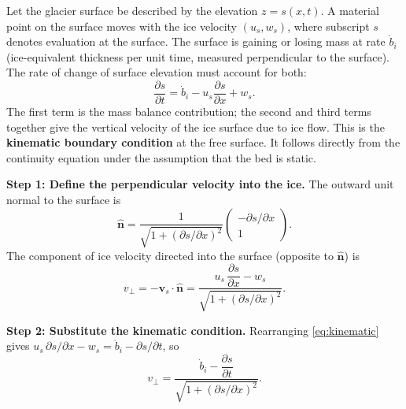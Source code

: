 \documentclass[11pt]{article}
\begin{document}
\begin{tcolorbox}[
  colback=orange!25,
  colframe=orange!70!black,
  title={\textbf{Derivation: Submergence and Emergence Velocities from the Kinematic Boundary Condition}},
  fonttitle=\bfseries,
  breakable
]

Let the glacier surface be described by the elevation $z = s(x,t)$.  A material point on the surface moves with the ice velocity $(u_s, w_s)$, where subscript $s$ denotes evaluation at the surface.  The surface is gaining or losing mass at rate $\dot{b}_i$ (ice-equivalent thickness per unit time, measured perpendicular to the surface).  The rate of change of surface elevation must account for both:
\begin{equation}
  \frac{\partial s}{\partial t} = \dot{b}_i - u_s\frac{\partial s}{\partial x} + w_s.
  \label{eq:kinematic}
\end{equation}
The first term is the mass balance contribution; the second and third terms together give the vertical velocity of the ice surface due to ice flow.  This is the \textbf{kinematic boundary condition} at the free surface.  It follows directly from the continuity equation under the assumption that the bed is static.

\medskip
\noindent\textbf{Step 1: Define the perpendicular velocity into the ice.}  The outward unit normal to the surface is
\begin{equation}
  \hat{\bm{n}} = \frac{1}{\sqrt{1 + \left(\partial s/\partial x\right)^2}}
    \begin{pmatrix} -\partial s/\partial x \\ 1 \end{pmatrix}.
\end{equation}
The component of ice velocity directed into the surface (opposite to $\hat{\bm{n}}$) is
\begin{equation}
  v_\perp = -\bm{v}_s \cdot \hat{\bm{n}}
    = \frac{u_s\,\dfrac{\partial s}{\partial x} - w_s}{\sqrt{1 + \left(\partial s/\partial x\right)^2}}.
\end{equation}

\medskip
\noindent\textbf{Step 2: Substitute the kinematic condition.}  Rearranging \eqref{eq:kinematic} gives $u_s\,\partial s/\partial x - w_s = \dot{b}_i - \partial s/\partial t$, so
\begin{equation}
  v_\perp = \frac{\dot{b}_i - \dfrac{\partial s}{\partial t}}{\sqrt{1 + \left(\partial s/\partial x\right)^2}}.
\end{equation}


\end{tcolorbox}
\end{document}
